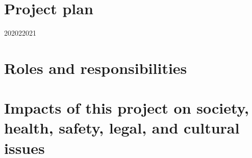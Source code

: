 \section{\ifenglish Project plan\else \fi}

\begin{plan}{6}{2020}{2}{2021}
\end{plan}

\section{\ifenglish Roles and responsibilities\else \fi}

\section{\ifenglish%
Impacts of this project on society, health, safety, legal, and cultural issues
\fi}